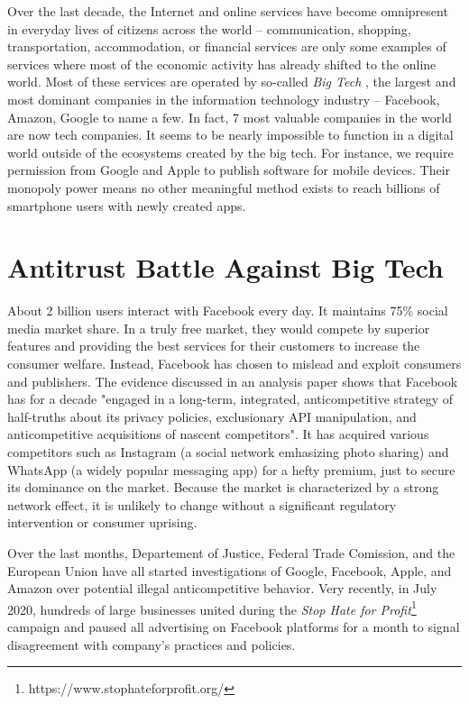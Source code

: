 Over the last decade, the Internet and online services have become omnipresent in everyday lives of citizens across the world – communication, shopping, transportation, accommodation, or financial services are only some examples of services where most of the economic activity has already shifted to the online world. Most of these services are operated by so-called \textit{Big Tech} \cite{bigtech}, the largest and most dominant companies in the information technology industry – Facebook, Amazon, Google to name a few. In fact, 7 most valuable companies in the world are now tech companies. It seems to be nearly impossible to function in a digital world outside of the ecosystems created by the big tech. For instance, we require permission from Google and Apple to publish software for mobile devices. Their monopoly power means no other meaningful method exists to reach billions of smartphone users with newly created apps.

\section{Antitrust Battle Against Big Tech}

About 2 billion users interact with Facebook every day. It maintains 75\% social media market share. In a truly free market, they would compete by superior features and providing the best services for their customers to increase the consumer welfare. Instead, Facebook has chosen to mislead and exploit consumers and publishers. The evidence discussed in an analysis paper \cite{antitrust} shows that Facebook has for a decade "engaged in a long-term,
integrated, anticompetitive strategy of half-truths about its privacy policies, exclusionary API manipulation, and anticompetitive acquisitions of nascent competitors". It has acquired various competitors such as Instagram (a social network emhasizing photo sharing) and WhatsApp (a widely popular messaging app) for a hefty premium, just to secure its dominance on the market. Because the market is characterized by a strong network effect, it is unlikely to change without a significant regulatory intervention or consumer uprising.

Over the last months, Departement of Justice, Federal Trade Comission, and the European Union have all started investigations of Google, Facebook, Apple, and Amazon over potential illegal anticompetitive behavior. Very recently, in July 2020, hundreds of large businesses united during the \textit{Stop Hate for Profit}\footnote{https://www.stophateforprofit.org/} campaign and paused all advertising on Facebook platforms for a month to signal disagreement with company's practices and policies.

